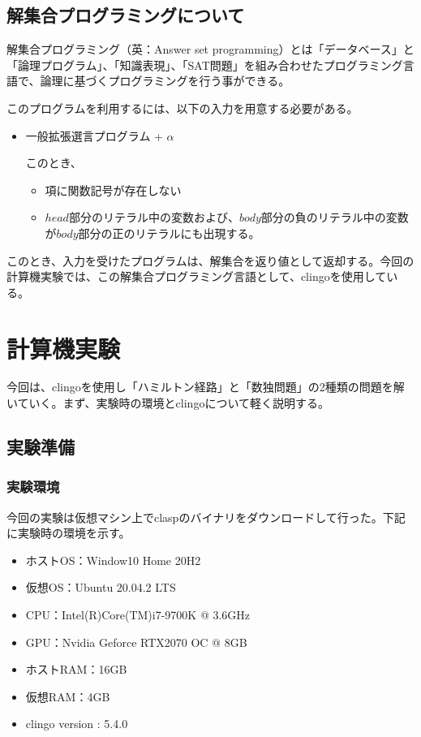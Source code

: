 \documentclass[dvipdfmx]{jsarticle}
\begin{document}
\subsection{解集合プログラミングについて}
解集合プログラミング（英：Answer set programming）とは「データベース」と「論理プログラム」、「知識表現」、「SAT問題」を組み合わせたプログラミング言語で、論理に基づくプログラミングを行う事ができる。\par
このプログラムを利用するには、以下の入力を用意する必要がある。
\begin{itemize}
  \item 一般拡張選言プログラム + $\alpha$\par
  このとき、
  \begin{itemize}
    \item 項に関数記号が存在しない
    \item $head$部分のリテラル中の変数および、$body$部分の負のリテラル中の変数が$body$部分の正のリテラルにも出現する。
  \end{itemize}
\end{itemize}
このとき、入力を受けたプログラムは、解集合を返り値として返却する。今回の計算機実験では、この解集合プログラミング言語として、clingoを使用している。
\section{計算機実験}
今回は、clingoを使用し「ハミルトン経路」と「数独問題」の2種類の問題を解いていく。まず、実験時の環境とclingoについて軽く説明する。
\subsection{実験準備}
  \subsubsection{実験環境}
  今回の実験は仮想マシン上でclaspのバイナリをダウンロードして行った。下記に実験時の環境を示す。
  \begin{itemize}
    \item ホストOS：Window10 Home 20H2
    \item 仮想OS：Ubuntu 20.04.2 LTS
    \item CPU：Intel(R)Core(TM)i7-9700K @ 3.6GHz
    \item GPU：Nvidia Geforce RTX2070 OC @ 8GB
    \item ホストRAM：16GB
    \item 仮想RAM：4GB
    \item clingo version : 5.4.0
  \end{itemize}
\end{document}
